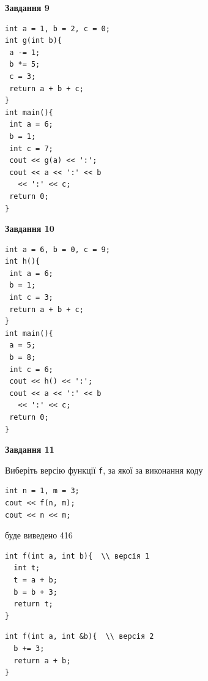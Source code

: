 \documentclass[12pt, ukrainian]{article}
\def\code#1{\Verb!#1!}
\begin{document}
{\begin {large}
\begin{minipage}[t]{11.0cm}
\end{minipage}


\begin{minipage}[t]{7.0cm}

\begin{center}
\textbf{Завдання 9}
\end{center}
\vspace{-8mm}

\begin{verbatim}
int a = 1, b = 2, c = 0;
int g(int b){
 a -= 1;
 b *= 5;
 c = 3;
 return a + b + c;
}
int main(){
 int a = 6;
 b = 1;
 int c = 7;
 cout << g(a) << ':';
 cout << a << ':' << b 
   << ':' << c;
 return 0;
}
\end{verbatim}



\begin{center}
\textbf{Завдання 10}
\end{center}
\vspace{-8mm}

\begin{verbatim}
int a = 6, b = 0, c = 9;
int h(){
 int a = 6;
 b = 1;
 int c = 3;
 return a + b + c;
}
int main(){
 a = 5;
 b = 8;
 int c = 6;
 cout << h() << ':';
 cout << a << ':' << b 
   << ':' << c;
 return 0;
}
\end{verbatim}

\end{minipage}
\vline \hspace{1mm}
\begin{minipage}[t]{11.0cm}

\begin{center}
\textbf{Завдання 11}
\end{center}
Виберіть версію функції \code{f}, за якої за виконання коду
\begin{verbatim}
int n = 1, m = 3;
cout << f(n, m);
cout << n << m;
\end{verbatim}

буде виведено 416

\begin{verbatim}
int f(int a, int b){  \\ версія 1
  int t;
  t = a + b;
  b = b + 3;
  return t;
}
\end{verbatim}

\vspace{-8mm}\begin{verbatim}
int f(int a, int &b){  \\ версія 2
  b += 3;
  return a + b;
}
\end{verbatim}


\end{minipage}
\end{large}}
\end{document}
